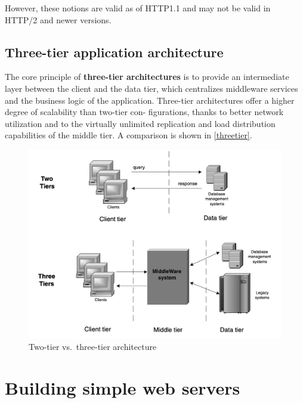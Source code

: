 However, these notions are valid as of HTTP1.1 and may not be valid in HTTP/2 and newer versions.

\subsection{Three-tier application architecture}
The core principle of \textbf{three-tier architectures}  is to provide an intermediate layer between the client and the data tier, which centralizes middleware services and the business logic of the application. Three-tier architectures offer a higher degree of scalability than two-tier con- figurations, thanks to better network utilization and to the virtually unlimited replication and load distribution capabilities of the middle tier. A comparison is shown in \autoref{threetier}.

\begin{figure}[ht]
    \centering
    \includegraphics[width=\textwidth]{threetier.png}
    \caption{Two-tier vs.\ three-tier architecture}
    \label{threetier}
\end{figure}


\section{Building simple web servers}

